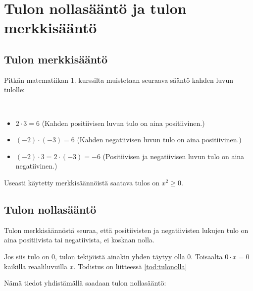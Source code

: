 \chapter{Tulon nollasääntö ja tulon merkkisääntö}

\section{Tulon merkkisääntö}

Pitkän matematiikan 1. kurssilta muistetaan seuraava sääntö kahden luvun tulolle:


\begin{esimerkki}{\ }
    \begin{itemize}
        \item $2\cdot 3 = 6$ (Kahden positiivisen luvun tulo on aina positiivinen.)
        \item $(-2)\cdot (-3) = 6$ (Kahden negatiivisen luvun tulo on aina positiivinen.)
        \item $(-2)\cdot 3 = 2\cdot (-3) = -6$ (Positiivisen ja negatiivisen luvun tulo on aina negatiivinen.)
    \end{itemize}
\end{esimerkki}

Useasti käytetty merkkisäännöistä saatava tulos on $x^2 \geq 0$.

\section{Tulon nollasääntö}

Tulon merkkisäännöstä seuraa, että positiivisten ja negatiivisten lukujen tulo on aina positiivista tai negatiivista, ei koskaan nolla.

Jos siis tulo on 0, tulon tekijöistä ainakin yhden täytyy olla 0. Toisaalta
$0\cdot x = 0$ kaikilla reaaliluvuilla $x$. Todistus on liitteessä \ref{tod:tulonolla}

Nämä tiedot yhdistämällä saadaan tulon nollasääntö:


